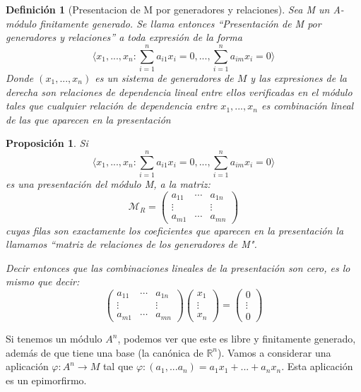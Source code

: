 \documentclass[11pt, a4paper, titlepage]{article}
\newif\IfInSansMode
\theoremstyle{theorem-style}
\newtheorem{nprop}{Proposición}[section]
\theoremstyle{definition-style}
\newtheorem{ndef}{Definición}[section]
\theoremstyle{remark-style}
\theoremstyle{example-style}
\begin{document}
\begin{ndef}[Presentacion de M por generadores y relaciones]
	Sea M un A-módulo finitamente generado. Se llama entonces “Presentación de M por generadores y relaciones” a toda expresión de la forma
	\[
	\langle x_1,...,x_n : \sum_{i=1}^n a_{i1}x_i = 0,...,\sum_{i=1}^n a_{im}x_i = 0 \rangle
	\]
	Donde $(x_1,...,x_n)$ es un sistema de generadores de $M$ y las expresiones de la derecha son relaciones de dependencia lineal entre ellos verificadas en el módulo tales que cualquier relación de dependencia entre $x_1,...,x_n$ es combinación lineal de las que aparecen en la presentación

\end{ndef}

\begin{nprop}
		Si
	\[
	\langle x_1,...,x_n : \sum_{i=1}^n a_{i1}x_i = 0,...,\sum_{i=1}^n a_{im}x_i = 0 \rangle
	\]
	es una presentación del módulo M, a la matriz:
	\[
	\mathcal{M}_R = \begin{pmatrix}
 a_{11} & \cdots & a_{1n}\\
 \vdots & & \vdots\\
 a_{m1} & \cdots & a_{mn}
\end{pmatrix}
	\]
	cuyas filas son exactamente los coeficientes que aparecen en la presentación la llamamos “matriz de relaciones de los generadores de M".

	Decir entonces que las combinaciones lineales de la presentación son cero, es lo mismo que decir:
	\[
	\begin{pmatrix}
 a_{11} & \cdots & a_{1n}\\
 \vdots & & \vdots\\
 a_{m1} & \cdots & a_{mn}
\end{pmatrix} \begin{pmatrix}
 x_1  \\
 \vdots\\
 x_n
\end{pmatrix} =  \begin{pmatrix}
 0  \\
 \vdots\\
 0
\end{pmatrix}
	\]
\end{nprop}


	Si tenemos un módulo $A^n$, podemos ver que este es libre y finitamente generado, además de que tiene una base (la canónica de $\mathbb{R}^n$). Vamos a considerar una aplicación $\varphi: A^n \to M$ tal que $\varphi:(a_1,...a_n) = a_1x_1+...+a_nx_n$. Esta aplicación es un epimorfirmo.
\end{document}
